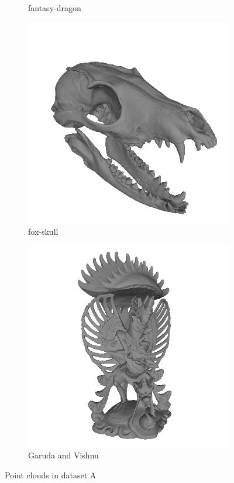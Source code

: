 \begin{figure}
\begin{subfigure}[b]{0.23\linewidth}
	\caption{fantasy-dragon}
\end{subfigure}
\begin{subfigure}[b]{0.23\linewidth}
	\includegraphics[width=\linewidth]{./Figures/train-dataset/18.fox-skull.png}
	\caption{fox-skull}
\end{subfigure}
\begin{subfigure}[b]{0.23\linewidth}
	\includegraphics[width=\linewidth]{./Figures/train-dataset/19.garuda-and-vishnu.png}
	\caption{Garuda and Vishnu}
\end{subfigure}
	\label{fig:dataset_a}
\caption{Point clouds in dataset A }
\end{figure}


